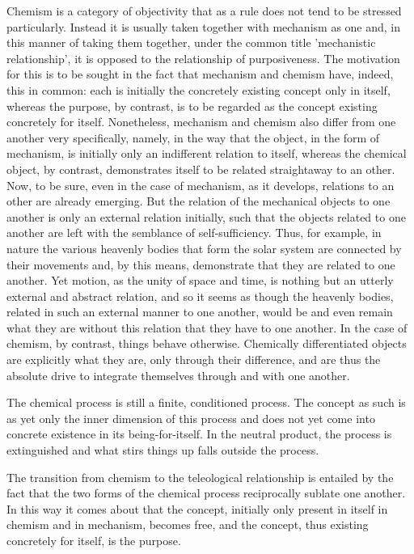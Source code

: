 Chemism is a category of objectivity that as a rule does not tend
to be stressed particularly.
Instead it is usually taken together with mechanism as one and,
in this manner of taking them together, under the common title
'mechanistic relationship', it is opposed to the relationship of purposiveness.
The motivation for this is to be sought in the fact that
mechanism and chemism have, indeed, this in common:
each is initially the concretely existing concept only in itself,
whereas the purpose, by contrast, is to be regarded as
the concept existing concretely for itself.
Nonetheless, mechanism and chemism also differ from one another very specifically,
namely, in the way that the object, in the form of mechanism, is
initially only an indifferent relation to itself, whereas
the chemical object, by contrast, demonstrates itself to be related straightaway to an other.
Now, to be sure, even in the case of mechanism, as it develops,
relations to an other are already emerging.
But the relation of the mechanical objects to one another is only
an external relation initially, such that the objects related
to one another are left with the semblance of self-sufficiency.
Thus, for example, in nature the various heavenly bodies that
form the solar system are connected by their movements and,
by this means, demonstrate that they are related to one another.
Yet motion, as the unity of space and time, is nothing but
an utterly external and abstract relation,
and so it seems as though the heavenly bodies,
related in such an external manner to one another,
would be and even remain what they are without this relation
that they have to one another.
In the case of chemism, by contrast, things behave otherwise.
Chemically differentiated objects are explicitly what they are,
only through their difference, and are thus the absolute drive
to integrate themselves through and with one another.

The chemical process is still a finite, conditioned process.
The concept as such is as yet only the inner dimension of this process and
does not yet come into concrete existence in its being-for-itself.
In the neutral product, the process is extinguished and
what stirs things up falls outside the process.

The transition from chemism to the teleological relationship is entailed
by the fact that the two forms of the chemical process reciprocally
sublate one another.
In this way it comes about that the concept, initially only present in
itself in chemism and in mechanism, becomes free, and the concept,
thus existing concretely for itself, is the purpose.

